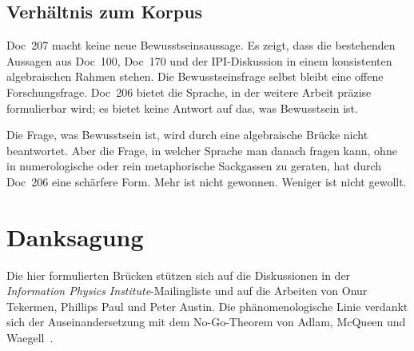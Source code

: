\subsection{Verhältnis zum Korpus}

\begin{center}
\end{center}

Doc~207 macht keine neue Bewusstseinsaussage. Es zeigt, dass die bestehenden Aussagen aus Doc~100, Doc~170 und der IPI-Diskussion in einem konsistenten algebraischen Rahmen stehen. Die Bewusstseinsfrage selbst bleibt eine offene Forschungsfrage. Doc~206 bietet die Sprache, in der weitere Arbeit präzise formulierbar wird; es bietet keine Antwort auf das, was Bewusstsein ist.

\begin{philosophical}[Schluss]
Die Frage, was Bewusstsein ist, wird durch eine algebraische Brücke nicht beantwortet. Aber die Frage, in welcher Sprache man danach fragen kann, ohne in numerologische oder rein metaphorische Sackgassen zu geraten, hat durch Doc~206 eine schärfere Form. Mehr ist nicht gewonnen. Weniger ist nicht gewollt.
\end{philosophical}

\section*{Danksagung}

Die hier formulierten Brücken stützen sich auf die Diskussionen in der \emph{Information Physics Institute}-Mailingliste und auf die Arbeiten von Onur Tekermen, Phillips Paul und Peter Austin. Die phänomenologische Linie verdankt sich der Auseinandersetzung mit dem No-Go-Theorem von Adlam, McQueen und Waegell~\cite{Adlam2025}.

